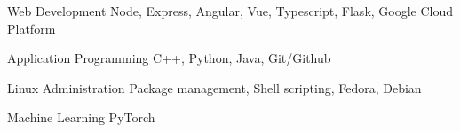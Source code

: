 
\begin{cvskills}
  \cvskill
  	{Web Development}
  	{Node, Express, Angular, Vue, Typescript, Flask, Google Cloud Platform}
  
  \cvskill
  	{Application Programming}
  	{C++, Python, Java, Git/Github}
  	
  \cvskill
  	{Linux Administration}
  	{Package management, Shell scripting, Fedora, Debian}
  
  \cvskill
  	{Machine Learning}
  	{PyTorch}
\end{cvskills}
